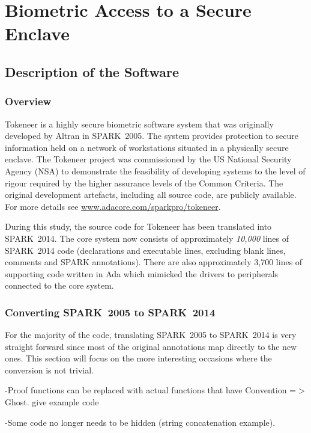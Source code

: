 \documentclass[10pt,a4paper,twocolumn]{article}
\newcommand{\oldspark}{SPARK~2005\xspace}
\newcommand{\newspark}{SPARK~2014\xspace}
\begin{document}
\section{Biometric Access to a Secure Enclave}


\subsection{Description of the Software}

\subsubsection{Overview}

Tokeneer is a highly secure biometric software system that was
originally developed by Altran in \oldspark. The system provides
protection to secure information held on a network of workstations
situated in a physically secure enclave. The Tokeneer project was
commissioned by the US National Security Agency (NSA) to demonstrate
the feasibility of developing systems to the level of rigour required
by the higher assurance levels of the Common Criteria. The original
development artefacts, including all source code, are publicly
available. For more details see
\url{www.adacore.com/sparkpro/tokeneer}.

During this study, the source code for Tokeneer has been translated
into \newspark. The core system now consists of approximately
\emph{10,000} lines of \newspark code (declarations and executable
lines, excluding blank lines, comments and SPARK annotations). There
are also approximately 3,700 lines of supporting code written in Ada
which mimicked the drivers to peripherals connected to the core
system.

\subsubsection{Converting \oldspark to \newspark}

For the majority of the code, translating \oldspark to \newspark is
very straight forward since most of the original annotations map
directly to the new ones. This section will focus on the more
interesting occasions where the conversion is not trivial.

-Proof functions can be replaced with actual functions that have
Convention =$>$ Ghost. {give example code}

-Some code no longer needs to be hidden (string concatenation example).
\end{document}
